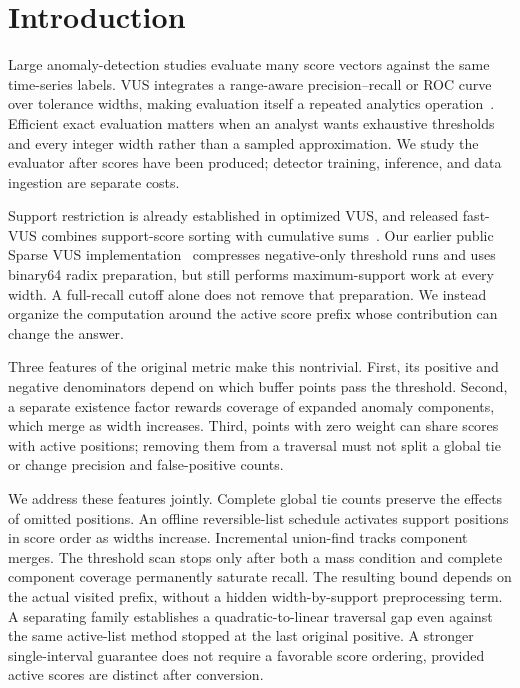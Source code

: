 \section{Introduction}
Large anomaly-detection studies evaluate many score vectors against the same
time-series labels. VUS integrates a range-aware precision--recall or ROC
curve over tolerance widths, making evaluation itself a repeated analytics
operation~\cite{paparrizos2022,boniol2025}. Efficient exact evaluation matters
when an analyst wants exhaustive thresholds and every integer width rather
than a sampled approximation. We study the evaluator after scores have been
produced; detector training, inference, and data ingestion are separate costs.

Support restriction is already established in optimized VUS, and released
fast-VUS combines support-score sorting with cumulative
sums~\cite{boniol2025,klein2026}. Our earlier public Sparse VUS implementation~\cite{sparsevus03}
compresses negative-only threshold runs and uses binary64 radix preparation,
but still performs maximum-support work at every width. A full-recall cutoff
alone does not remove that preparation. We instead organize the computation
around the active score prefix whose contribution can change the answer.

Three features of the original metric make this nontrivial. First, its
positive and negative denominators depend on which buffer points pass the
threshold. Second, a separate existence factor rewards coverage of expanded
anomaly components, which merge as width increases. Third, points with zero
weight can share scores with active positions; removing them from a traversal
must not split a global tie or change precision and false-positive counts.

We address these features jointly. Complete global tie counts preserve the
effects of omitted positions. An offline reversible-list schedule activates
support positions in score order as widths increase. Incremental union-find
tracks component merges. The threshold scan stops only after both a mass
condition and complete component coverage permanently saturate recall. The
resulting bound depends on the actual visited prefix, without a hidden
width-by-support preprocessing term. A separating family establishes a
quadratic-to-linear traversal gap even against the same active-list method
stopped at the last original positive. A stronger single-interval guarantee
does not require a favorable score ordering, provided active scores are
distinct after conversion.

